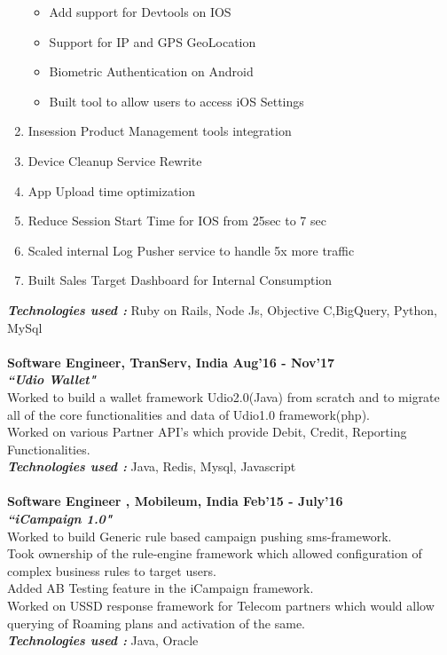 \documentclass[line, margin]{res}
\begin{document}
\begin{resume}
\begin{enumerate}
\begin{itemize}
     \item Add support for Devtools on IOS
     \item Support for IP and GPS GeoLocation
     \item Biometric Authentication on Android
     \item Built tool to allow users to access iOS Settings
   \end{itemize}
   \item Insession Product Management tools integration
   \item Device Cleanup Service Rewrite
   \item App Upload time optimization
   \item Reduce Session Start Time for IOS from 25sec to 7 sec
   \item Scaled internal Log Pusher service to handle 5x more traffic
   \item Built Sales Target Dashboard for Internal Consumption
\end{enumerate}
\textbf{\textit{Technologies used : }} Ruby on Rails, Node Js, Objective C,BigQuery, Python, MySql\\
\\
\textbf{Software Engineer, TranServ, India \hfill Aug'16 - Nov'17} \\
\textbf{\textit{``Udio Wallet"}} \\
Worked to build a wallet framework Udio2.0(Java) from scratch and to migrate all of the core functionalities and data of Udio1.0 framework(php). \\
Worked on various Partner API's which provide Debit, Credit, Reporting Functionalities.\\
\textbf{\textit{Technologies used : }} Java, Redis, Mysql, Javascript \\
\\
\textbf{Software Engineer , Mobileum, India \hfill Feb'15 - July'16} \\
\textbf{\textit{``iCampaign 1.0"}} \\
Worked to build Generic rule based campaign pushing sms-framework.\\
Took ownership of the rule-engine framework which allowed configuration of complex business rules to target users. \\
Added AB Testing feature in the iCampaign framework.\\
Worked on USSD response framework for Telecom partners which would allow querying of Roaming plans and activation of the same.\\
\textbf{\textit{Technologies used : }} Java, Oracle \\
\\


\end{resume}
\end{document}
